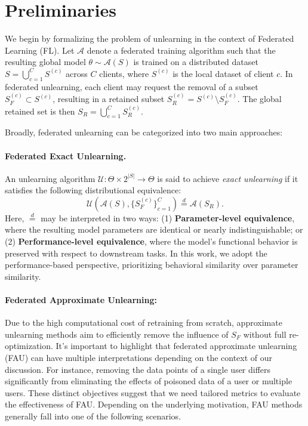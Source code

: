 \documentclass{article}
\begin{document}
\section{Preliminaries}



We begin by formalizing the problem of unlearning in the context of Federated Learning (FL). Let $\mathcal{A}$ denote a federated training algorithm such that the resulting global model $\theta \sim \mathcal{A}(S)$ is trained on a distributed dataset $S = \bigcup_{c=1}^{C} S^{(c)}$ across $C$ clients, where $S^{(c)}$ is the local dataset of client $c$. In federated unlearning, each client may request the removal of a subset $S_F^{(c)} \subset S^{(c)}$, resulting in a retained subset $S_R^{(c)} = S^{(c)} \setminus S_F^{(c)}$. The global retained set is then $S_R = \bigcup_{c=1}^{C} S_R^{(c)}$.

Broadly, federated unlearning can be categorized into two main approaches:

\paragraph{Federated Exact Unlearning.}
An unlearning algorithm $\mathcal{U}: \Theta \times 2^{|S|} \to \Theta$ is said to achieve \textit{exact unlearning} if it satisfies the following distributional equivalence:
\[
\mathcal{U}(\mathcal{A}(S), \{S_F^{(c)}\}_{c=1}^C) \overset{d}{=} \mathcal{A}(S_R).
\]
Here, $\overset{d}{=}$ may be interpreted in two ways:
(1) \textbf{Parameter-level equivalence}, where the resulting model parameters are identical or nearly indistinguishable; or
(2) \textbf{Performance-level equivalence}, where the model’s functional behavior is preserved with respect to downstream tasks.
In this work, we adopt the performance-based perspective, prioritizing behavioral similarity over parameter similarity.

\paragraph{Federated Approximate Unlearning:} Due to the high computational cost of retraining from scratch, approximate unlearning methods aim to efficiently remove the influence of $S_F$ without full re-optimization. It’s important to highlight that federated approximate unlearning (FAU) can have multiple interpretations depending on the context of our discussion. For instance, removing the data points of a single user differs significantly from eliminating the effects of poisoned data of a user or multiple users. These distinct objectives suggest that we need tailored metrics to evaluate the effectiveness of FAU. Depending on the underlying motivation, FAU methods generally fall into one of the following scenarios.
\end{document}
